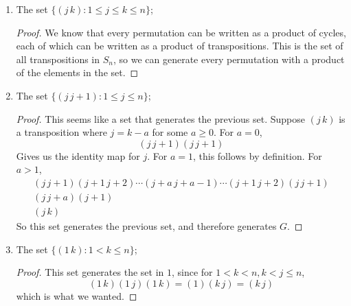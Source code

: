 \documentclass{article}
\begin{document}
\begin{enumerate}
	\item The set $\{(j \, k) : 1 \leq j \leq k \leq n\}$;
		\begin{proof}
			We know that every permutation can be written as a product of cycles, each of which can be  written as a product of transpositions. This is the set of all transpositions in $S_{n}$, so we can generate every permutation with a product of the elements in the set.
		\end{proof}

	\item The set $\{(j \, j + 1) : 1 \leq j \leq n\}$;
		\begin{proof}
			This seems like a set that generates the previous set. Suppose $(j \, k)$ is a transposition where $j = k - a$ for some $a \geq 0$. For $a = 0$,
			\begin{equation*}
				(j \, j + 1)(j \, j + 1)
			\end{equation*}
			Gives us the identity map for $j$. For $a = 1$, this follows by definition. For $a > 1$, 
			\begin{gather*}
				(j \, j + 1)(j + 1 \, j + 2) \cdots (j + a \, j + a - 1) \cdots (j + 1 \, j + 2)(j \, j + 1) \\
				(j \, j + a)(j + 1) \\
				(j \, k)
			\end{gather*}
			So this set generates the previous set, and therefore generates $G$. 
		\end{proof}

	\item The set $\{(1 \, k) : 1 < k \leq n\}$;
		\begin{proof}
			This set generates the set in $1$, since for $1 < k < n, k < j \leq n$, 
			\begin{equation*}
				(1 \, k)(1 \, j)(1 \, k) = (1)(k \, j) = (k \, j)
			\end{equation*}
			which is what we wanted.
		\end{proof}


\end{enumerate}
\end{document}
